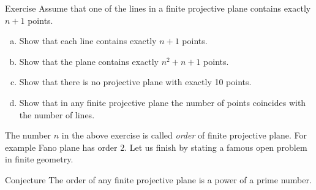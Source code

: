 \begin{thm}{Exercise}\label{ex:oder}
Assume that one of the lines in a finite projective plane contains exactly $n+1$ points.
\begin{enumerate}[(a)]
\item\label{ex:oder:a} Show that each line contains exactly $n+1$ points.
\item\label{ex:oder:b} Show that the plane contains  exactly $n^2+n+1$ points.
\item\label{ex:oder:c} Show that there is no projective plane with exactly 10 points.
\item\label{ex:oder:d} Show that in any finite projective plane the number of points coincides with the number of lines.
\end{enumerate}
\end{thm}

The number $n$ in the above exercise is called \emph{order} of finite projective plane.
For example Fano plane has order $2$.
Let us finish by stating a famous open problem in finite geometry.

\begin{thm}{Conjecture}
The order of any finite projective plane is a power of a prime number.
\end{thm}

